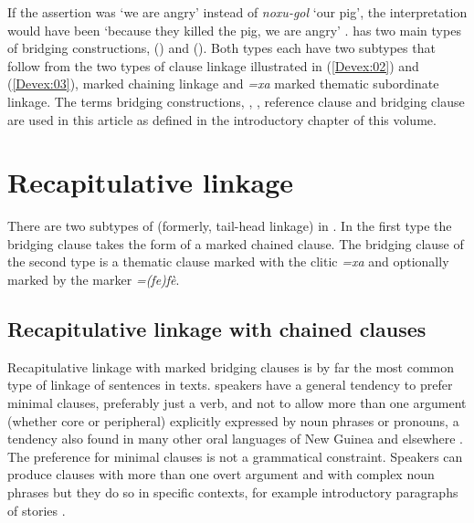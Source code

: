 \documentclass[output=paper]{LSP/langsci}
\begin{document}
If the assertion was `we are angry' instead of \textit{noxu-gol} `our pig', the interpretation would have been `because they killed the pig, we are angry' \citep[][826]{devries.2006}.  has two main types of bridging constructions,  ()
and  (). Both types each have two subtypes that follow from the two types of clause linkage illustrated in (\ref{Devex:02}) and (\ref{Devex:03}),  marked chaining linkage and \textit{=xa} marked thematic subordinate linkage. The terms bridging constructions, , , reference clause and bridging clause are used in this article as defined in the introductory chapter of this volume.


\section{Recapitulative linkage} 
\label{Devrecap.link}
There are two subtypes of  (formerly, tail-head linkage) in  \citep[][372--374]{devries.2005}. In the first type the bridging clause takes the form of a  marked chained clause. The bridging clause of the second type is a thematic clause marked with the clitic \textit{=xa} and optionally marked by the  marker \textit{=(fe)fè}. 

\subsection{Recapitulative linkage with chained clauses} 
\label{Devrecap.link.chained}
Recapitulative linkage with  marked bridging clauses is by far the most common type of linkage of sentences  in  texts.  speakers have a general tendency to prefer minimal clauses, preferably just a verb, and not to allow more than one argument (whether core or peripheral) explicitly expressed by noun phrases or pronouns, a tendency also found in many other oral languages of New Guinea and elsewhere \citep{foley.2000,dubois87}. The preference for minimal clauses is not a grammatical constraint. Speakers can produce clauses with more than one overt argument and with complex noun phrases but they do so in specific contexts, for example introductory paragraphs of stories \citep[][369]{devries.2005}.
\end{document}
